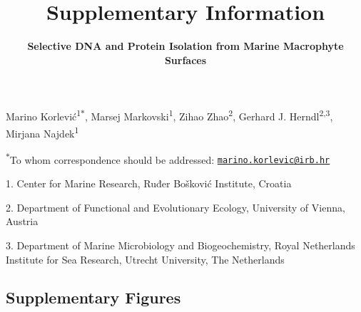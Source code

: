 \documentclass[12pt,]{article}
\title{\textbf{Supplementary Information}}
\subtitle{\textbf{Selective DNA and Protein Isolation from Marine Macrophyte
Surfaces}}
\author{}
\date{}
\begin{document}
\maketitle

\vspace{60mm}

Marino Korlević\textsuperscript{1\(*\)}, Marsej
Markovski\textsuperscript{1}, Zihao Zhao\textsuperscript{2}, Gerhard J.
Herndl\textsuperscript{2,3}, Mirjana Najdek\textsuperscript{1}

\vspace{40mm}

\textsuperscript{\(*\)}To whom correspondence should be addressed:
\href{mailto:marino.korlevic@irb.hr}{\nolinkurl{marino.korlevic@irb.hr}}

1. Center for Marine Research, Ruđer Bošković Institute, Croatia

2. Department of Functional and Evolutionary Ecology, University of
Vienna, Austria

3. Department of Marine Microbiology and Biogeochemistry, Royal
Netherlands Institute for Sea Research, Utrecht University, The
Netherlands

\setlength\parindent{24pt}

\hypertarget{supplementary-figures}{%
\subsection{Supplementary Figures}\label{supplementary-figures}}
\end{document}
